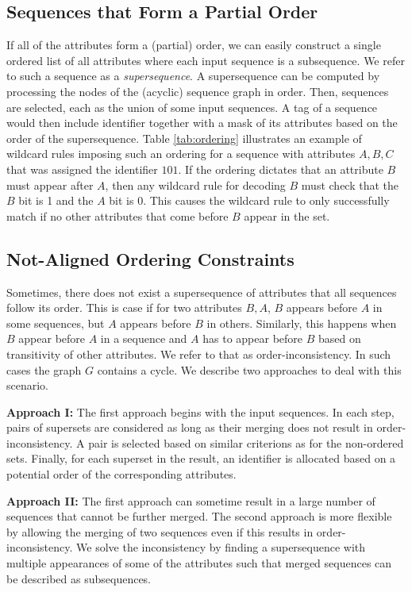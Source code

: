 \subsection{Sequences that Form a Partial Order}
If all of the attributes form a (partial) order, we can easily construct a single ordered list of all attributes where each input sequence is a subsequence. We refer to such a sequence as a \emph{supersequence}.  A supersequence can be computed by processing the nodes of the (acyclic) sequence graph in order. 
%
Then, sequences are selected, each as the union of some input sequences. A tag of a sequence would then include identifier together with a mask of its attributes based on the order of the supersequence.  Table \ref{tab:ordering} illustrates an example of wildcard rules imposing such an ordering for a sequence with attributes $A, B, C$ that was assigned the identifier $101$.  If the ordering dictates that an attribute $B$ must appear after $A$, then any wildcard rule for decoding $B$ must check that the $B$ bit is 1 and the $A$ bit is 0. This causes the wildcard rule to only successfully match if no other attributes that come before $B$ appear in the set. %

\subsection{Not-Aligned Ordering Constraints}
Sometimes, there does not exist a supersequence of attributes that all sequences follow its order. This is case  if for two attributes $B, A$,  $B$ appears before $A$ in some sequences, but $A$ appears before $B$ in others. Similarly, this happens when $B$ appear before $A$ in a sequence and $A$ has to appear before $B$ based on transitivity of other attributes. We refer to that as order-inconsistency.  In such cases the graph $G$ contains a cycle. We describe two approaches to deal with this scenario. 

\textbf{Approach I:} The first approach begins with the input sequences. In each step, pairs of supersets are considered as long as their merging does not result in order-inconsistency. A pair is selected based on similar criterions as for the non-ordered sets. Finally, for each superset in the result, an identifier is allocated based on a potential order of the corresponding attributes.

\textbf{Approach II:} The first approach can sometime result in a large number of sequences that cannot be further merged. The second approach is more flexible by allowing the merging of two sequences even if this results in order-inconsistency. We solve the inconsistency by finding a supersequence with multiple appearances of some of the attributes such that merged sequences can be described as subsequences. 

